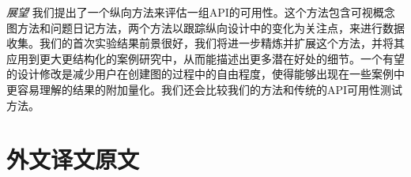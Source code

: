 \textit{展望}
我们提出了一个纵向方法来评估一组API的可用性。这个方法包含可视概念图方法和问题日记方法，两个方法以跟踪纵向设计中的变化为关注点，来进行数据收集。我们的首次实验结果前景很好，我们将进一步精炼并扩展这个方法，并将其应用到更大更结构化的案例研究中，从而能描述出更多潜在好处的细节。一个有望的设计修改是减少用户在创建图的过程中的自由程度，使得能够出现在一些案例中更容易理解的结果的附加量化。我们还会比较我们的方法和传统的API可用性测试方法。

\newpage

\section*{外文译文原文}





